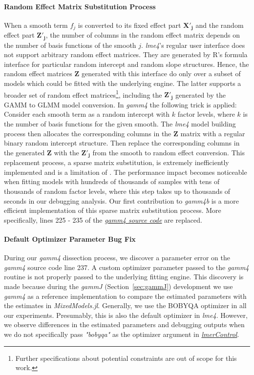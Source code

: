 \paragraph{Random Effect Matrix Substitution Process}
When a smooth term $f_j$ is converted to its fixed effect part $\mathbf{X'_j}$ and the random effect part $\mathbf{Z'_j}$, the number of columns in the random effect matrix depends on the number of basis functions of the smooth $j$. \textit{lme4}'s regular user interface does not support arbitrary random effect matrices. They are generated by R's formula interface for particular random intercept and random slope structures. Hence, the random effect matrices $\mathbf{Z}$ generated with this interface do only over a subset of models which could be fitted with the underlying engine. The latter supports a broader set of random effect matrices\footnote{Further specifications about potential constraints are out of scope for this work.}, including the $\mathbf{Z'_j}$ generated by the GAMM to GLMM model conversion. In \textit{gamm4} the following trick is applied: Consider each smooth term as a random intercept with $k$ factor levels, where $k$ is the number of basis functions for the given smooth. The \textit{lme4} model building process then allocates the corresponding columns in the $\mathbf{Z}$ matrix with a regular binary random intercept structure. Then replace the corresponding columns in the generated $\mathbf{Z}$ with the $\mathbf{Z'_j}$ from the smooth to random effect conversion. This replacement process, a sparse matrix substitution, is extremely inefficiently implemented and is a limitation of \cite{bates_matrix_2024}. The performance impact becomes noticeable when fitting models with hundreds of thousands of samples with tens of thousands of random factor levels, where this step takes up to thousands of seconds in our debugging analysis. Our first contribution to \textit{gamm4b} is a more efficient implementation of this sparse matrix substitution process. More specifically, lines 225 - 235 of the \href{https://github.com/cran/gamm4/blob/master/R/gamm4.r}{\textit{gamm4 source code}} are replaced.

\paragraph{Default Optimizer Parameter Bug Fix}
During our \textit{gamm4} dissection process, we discover a parameter error on the \textit{gamm4} source code line 237. A custom optimizer parameter passed to the \textit{gamm4} routine is not properly passed to the underlying fitting engine. This discovery is made because during the \textit{gammJ} (Section~\ref{sec:gammJ}) development we use \textit{gamm4} as a reference implementation to compare the estimated parameters with the estimates in \textit{MixedModels.jl}. Generally, we use the BOBYQA optimizer \citep{powell_bobyqa_2009} in all our experiments. Presumably, this is also the default optimizer in \textit{lme4}. However, we observe differences in the estimated parameters and debugging outputs when we do not specifically pass \textit{"bobyqa"} as the optimizer argument in \href{https://search.r-project.org/CRAN/refmans/lme4/html/lmerControl.html}{\textit{lmerControl}}.

